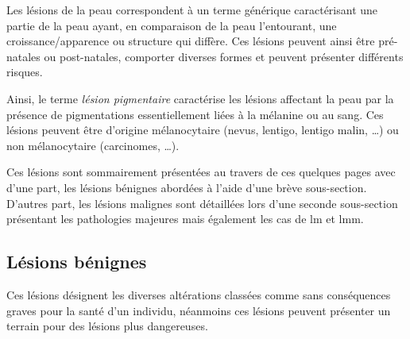Les lésions de la peau correspondent à un terme générique caractérisant une partie de la peau ayant, en comparaison de la peau l’entourant, une croissance/apparence ou structure qui diffère. Ces lésions peuvent ainsi être pré-natales ou post-natales, comporter diverses formes et peuvent présenter différents risques.\par

Ainsi, le terme \textit{lésion pigmentaire} caractérise les lésions affectant la peau par la présence de pigmentations essentiellement liées à la mélanine ou au sang. Ces lésions peuvent être d’origine mélanocytaire (nevus, lentigo, lentigo malin, \ldots) ou non mélanocytaire (carcinomes, \ldots).\par

Ces lésions sont sommairement présentées au travers de ces quelques pages avec d'une part, les lésions bénignes abordées à l'aide d'une brève sous-section. D'autres part, les lésions malignes sont détaillées lors d'une seconde sous-section présentant les pathologies majeures mais également les cas de \acrlong{lm} et \acrlong{lmm}.\par

\subsection{Lésions bénignes}
Ces lésions désignent les diverses altérations classées comme sans conséquences graves pour la santé d'un individu, néanmoins ces lésions peuvent présenter un terrain pour des lésions plus dangereuses.\par

